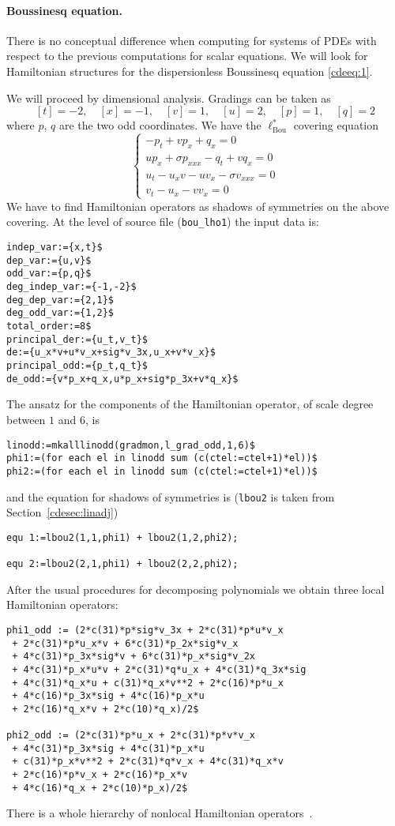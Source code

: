 \paragraph*{Boussinesq equation.}
\label{cdesec:comp-syst-pdes}
There is no conceptual difference when computing for systems of PDEs with
respect to the previous computations for scalar equations. We will look for
Hamiltonian structures for the dispersionless Boussinesq equation \eqref{cdeeq:1}.

We will proceed by dimensional analysis. Gradings can be taken as
\[
  [t]=-2,\quad [x]=-1,\quad [v]=1,\quad [u]=2,\quad [p]=1,\quad [q]=2
\]
where $p$, $q$ are the two odd coordinates. We have the
$\ell^*_{\text{Bou}}$ covering equation
\[
  \label{eq:12}
  \left\{
  \begin{array}{l}
    -p_t+vp_x+q_x=0\\
    up_x+\sigma p_{xxx}-q_t+vq_x=0\\
  u_t-u_xv-uv_x-\sigma v_{xxx}=0\\
  v_t-u_x-vv_x=0
\end{array}
\right.
\]
We have to find Hamiltonian operators as shadows of symmetries on the above
covering.  At the level of source file (\texttt{bou\_lho1}) the input
data is:
\begin{verbatim}
indep_var:={x,t}$
dep_var:={u,v}$
odd_var:={p,q}$
deg_indep_var:={-1,-2}$
deg_dep_var:={2,1}$
deg_odd_var:={1,2}$
total_order:=8$
principal_der:={u_t,v_t}$
de:={u_x*v+u*v_x+sig*v_3x,u_x+v*v_x}$
principal_odd:={p_t,q_t}$
de_odd:={v*p_x+q_x,u*p_x+sig*p_3x+v*q_x}$
\end{verbatim}
The ansatz for the components of the Hamiltonian operator, of scale degree
between $1$ and $6$, is
\begin{verbatim}
linodd:=mkalllinodd(gradmon,l_grad_odd,1,6)$
phi1:=(for each el in linodd sum (c(ctel:=ctel+1)*el))$
phi2:=(for each el in linodd sum (c(ctel:=ctel+1)*el))$
\end{verbatim}
and the equation for shadows of symmetries is (\texttt{lbou2} is taken from
Section~\ref{cdesec:linadj})
\begin{verbatim}
equ 1:=lbou2(1,1,phi1) + lbou2(1,2,phi2);

equ 2:=lbou2(2,1,phi1) + lbou2(2,2,phi2);
\end{verbatim}
After the usual procedures for decomposing polynomials we obtain three local
Hamiltonian operators:
\begin{small}
\begin{verbatim}
phi1_odd := (2*c(31)*p*sig*v_3x + 2*c(31)*p*u*v_x
 + 2*c(31)*p*u_x*v + 6*c(31)*p_2x*sig*v_x
 + 4*c(31)*p_3x*sig*v + 6*c(31)*p_x*sig*v_2x
 + 4*c(31)*p_x*u*v + 2*c(31)*q*u_x + 4*c(31)*q_3x*sig
 + 4*c(31)*q_x*u + c(31)*q_x*v**2 + 2*c(16)*p*u_x
 + 4*c(16)*p_3x*sig + 4*c(16)*p_x*u
 + 2*c(16)*q_x*v + 2*c(10)*q_x)/2$

phi2_odd := (2*c(31)*p*u_x + 2*c(31)*p*v*v_x
 + 4*c(31)*p_3x*sig + 4*c(31)*p_x*u
 + c(31)*p_x*v**2 + 2*c(31)*q*v_x + 4*c(31)*q_x*v
 + 2*c(16)*p*v_x + 2*c(16)*p_x*v
 + 4*c(16)*q_x + 2*c(10)*p_x)/2$
\end{verbatim}
\end{small}
There is a whole hierarchy of nonlocal Hamiltonian operators~\cite{KerstenKrasilshchikVerboretsky:2004}.


